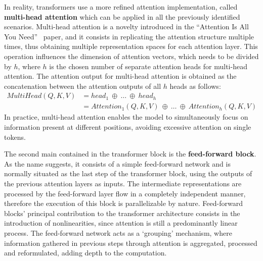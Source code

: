 In reality, transformers use a more refined attention implementation, called \textbf{multi-head attention} which can be applied in all the previously identified scenarios.
Multi-head attention is a novelty introduced in the ``Attention Is All You Need''~\cite{vaswani2017} paper, and it consists in replicating the attention structure multiple times, thus obtaining multiple representation spaces for each attention layer.
This operation influences the dimension of attention vectors, which needs to be divided by $h$, where $h$ is the chosen number of separate attention heads for multi-head attention.
The attention output for multi-head attention is obtained as the concatenation between the attention outputs of all $h$ heads as follows:
\begin{equation}
    \label{eq:background_multihead-attention}
    \begin{aligned}
    MultiHead(Q,K,V)    &= head_1\ \oplus\ \ldots\ \oplus\ head_h \\
                        &= Attention_1(Q,K,V)\ \oplus\ \ldots\ \oplus\ Attention_h(Q,K,V)
    \end{aligned}
\end{equation}
In practice, multi-head attention enables the model to simultaneously focus on information present at different positions, avoiding excessive attention on single tokens.


The second main  contained in the transformer block is the \textbf{feed-forward block}.
As the name suggests, it consists of a simple feed-forward network and is normally situated as the last step of the transformer block, using the outputs of the previous attention layers as inputs.
The intermediate representations are processed by the feed-forward layer flow in a completely independent manner, therefore the execution of this block is parallelizable by nature.
Feed-forward blocks' principal contribution to the transformer architecture consists in the introduction of nonlinearities, since attention is still a predominantly linear process.
The feed-forward network acts as a `grouping' mechanism, where information gathered in previous steps through attention is aggregated, processed and reformulated, adding depth to the computation.

